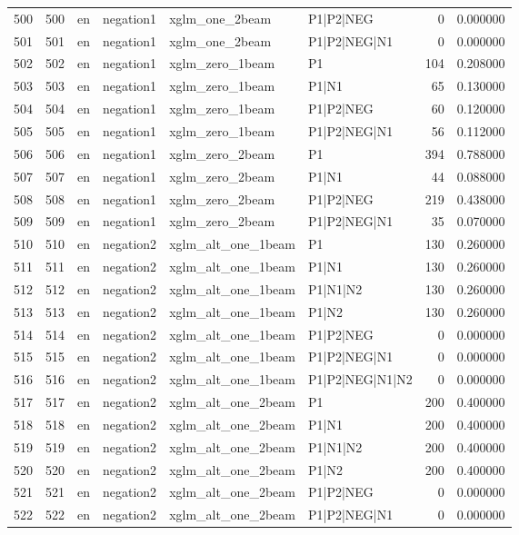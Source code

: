 \begin{tabular}{lrllllrr}
500 & 500 & en & negation1 & xglm_one_2beam & P1|P2|NEG & 0 & 0.000000 \\
501 & 501 & en & negation1 & xglm_one_2beam & P1|P2|NEG|N1 & 0 & 0.000000 \\
502 & 502 & en & negation1 & xglm_zero_1beam & P1 & 104 & 0.208000 \\
503 & 503 & en & negation1 & xglm_zero_1beam & P1|N1 & 65 & 0.130000 \\
504 & 504 & en & negation1 & xglm_zero_1beam & P1|P2|NEG & 60 & 0.120000 \\
505 & 505 & en & negation1 & xglm_zero_1beam & P1|P2|NEG|N1 & 56 & 0.112000 \\
506 & 506 & en & negation1 & xglm_zero_2beam & P1 & 394 & 0.788000 \\
507 & 507 & en & negation1 & xglm_zero_2beam & P1|N1 & 44 & 0.088000 \\
508 & 508 & en & negation1 & xglm_zero_2beam & P1|P2|NEG & 219 & 0.438000 \\
509 & 509 & en & negation1 & xglm_zero_2beam & P1|P2|NEG|N1 & 35 & 0.070000 \\
510 & 510 & en & negation2 & xglm_alt_one_1beam & P1 & 130 & 0.260000 \\
511 & 511 & en & negation2 & xglm_alt_one_1beam & P1|N1 & 130 & 0.260000 \\
512 & 512 & en & negation2 & xglm_alt_one_1beam & P1|N1|N2 & 130 & 0.260000 \\
513 & 513 & en & negation2 & xglm_alt_one_1beam & P1|N2 & 130 & 0.260000 \\
514 & 514 & en & negation2 & xglm_alt_one_1beam & P1|P2|NEG & 0 & 0.000000 \\
515 & 515 & en & negation2 & xglm_alt_one_1beam & P1|P2|NEG|N1 & 0 & 0.000000 \\
516 & 516 & en & negation2 & xglm_alt_one_1beam & P1|P2|NEG|N1|N2 & 0 & 0.000000 \\
517 & 517 & en & negation2 & xglm_alt_one_2beam & P1 & 200 & 0.400000 \\
518 & 518 & en & negation2 & xglm_alt_one_2beam & P1|N1 & 200 & 0.400000 \\
519 & 519 & en & negation2 & xglm_alt_one_2beam & P1|N1|N2 & 200 & 0.400000 \\
520 & 520 & en & negation2 & xglm_alt_one_2beam & P1|N2 & 200 & 0.400000 \\
521 & 521 & en & negation2 & xglm_alt_one_2beam & P1|P2|NEG & 0 & 0.000000 \\
522 & 522 & en & negation2 & xglm_alt_one_2beam & P1|P2|NEG|N1 & 0 & 0.000000 \\

\end{tabular}
